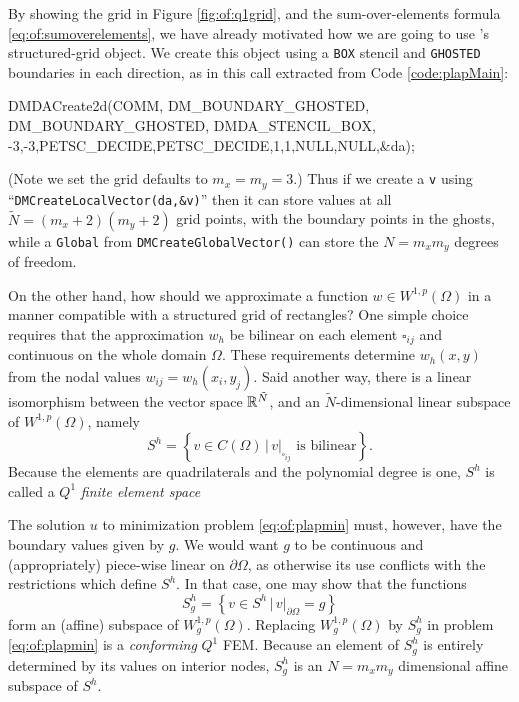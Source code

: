 By showing the grid in Figure \ref{fig:of:q1grid}, and the sum-over-elements formula \eqref{eq:of:sumoverelements}, we have already motivated how we are going to use \PETSc's \pDMDA structured-grid object.  We create this object using a \texttt{BOX} stencil and \texttt{GHOSTED} boundaries in each direction, as in this call extracted from Code \ref{code:plapMain}:
\begin{code}
  DMDACreate2d(COMM,
      DM_BOUNDARY_GHOSTED, DM_BOUNDARY_GHOSTED, DMDA_STENCIL_BOX,
      -3,-3,PETSC_DECIDE,PETSC_DECIDE,1,1,NULL,NULL,&da);
\end{code}
(Note we set the grid defaults to $m_x=m_y=3$.)  Thus if we create a \pVec \texttt{v} using ``\texttt{DMCreateLocalVector(da,\&v)}'' then it can store values at all $\tilde N = (m_x+2)(m_y+2)$ grid points, with the boundary points in the ghosts, while a \texttt{Global} \pVec from \texttt{DMCreateGlobalVector()} can store the $N=m_x m_y$ degrees of freedom.

On the other hand, how should we approximate a function $w \in W^{1,p}(\Omega)$ in a manner compatible with a structured grid of rectangles?  One simple choice requires that the approximation $w_h$ be bilinear on each element $\square_{ij}$ and continuous on the whole domain $\Omega$.  These requirements determine $w_h(x,y)$ from the nodal values $w_{ij} = w_h(x_i,y_j)$.  Said another way, there is a linear isomorphism between the vector space $\mathbb{R}^{\tilde N}$, and an $\tilde N$-dimensional linear subspace of $W^{1,p}(\Omega)$, namely
\begin{equation}
S^h = \left\{v \in C(\Omega) \, \Big| \, v|_{\square_{ij}} \text{ is bilinear}\right\}. \label{eq:of:Shdefn}
\end{equation}
Because the elements are quadrilaterals and the polynomial degree is one, $S^h$ is called a $Q^1$ \emph{finite element space} \citep{Elmanetal2005}

The solution $u$ to minimization problem \eqref{eq:of:plapmin} must, however, have the boundary values given by $g$.  We would want $g$ to be continuous and (appropriately) piece-wise linear on $\partial\Omega$, as otherwise its use conflicts with the restrictions which define $S^h$.  In that case, one may show that the functions
\begin{equation}
S_g^h = \left\{v \in S^h \, \Big| \, v|_{\partial \Omega} = g\right\} \label{eq:of:Sghdefn}
\end{equation}
form an (affine) subspace of $W_g^{1,p}(\Omega)$.  Replacing $W_g^{1,p}(\Omega)$ by $S_g^h$ in problem \eqref{eq:of:plapmin} is a \emph{conforming} $Q^1$ FEM.  Because an element of $S_g^h$ is entirely determined by its values on interior nodes, $S_g^h$ is an $N=m_x m_y$ dimensional affine subspace of $S^h$.


